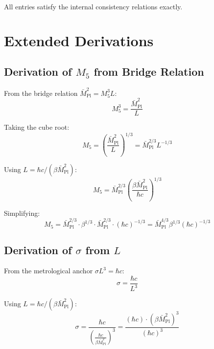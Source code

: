 \documentclass[11pt,a4paper]{article}
\begin{document}
All entries satisfy the internal consistency relations exactly.

\section{Extended Derivations}
\label{app:extended}

\subsection{Derivation of $M_5$ from Bridge Relation}

From the bridge relation $\bar{M}_{\text{Pl}}^2 = M_5^3 L$:
\begin{equation}
  M_5^3 = \frac{\bar{M}_{\text{Pl}}^2}{L}
  \label{eq:M5-cubed}
\end{equation}

Taking the cube root:
\begin{equation}
  M_5 = \left( \frac{\bar{M}_{\text{Pl}}^2}{L} \right)^{1/3}
      = \bar{M}_{\text{Pl}}^{2/3} L^{-1/3}
  \label{eq:M5-explicit}
\end{equation}

Using $L = \hbar c / (\beta \bar{M}_{\text{Pl}}^2)$:
\begin{equation}
  M_5 = \bar{M}_{\text{Pl}}^{2/3} \left( \frac{\beta \bar{M}_{\text{Pl}}^2}{\hbar c} \right)^{1/3}
  \label{eq:M5-from-beta}
\end{equation}

Simplifying:
\begin{equation}
  M_5 = \bar{M}_{\text{Pl}}^{2/3} \cdot \beta^{1/3} \cdot \bar{M}_{\text{Pl}}^{2/3} \cdot (\hbar c)^{-1/3}
      = \bar{M}_{\text{Pl}}^{4/3} \beta^{1/3} (\hbar c)^{-1/3}
  \label{eq:M5-simplified}
\end{equation}

\subsection{Derivation of $\sigma$ from $L$}

From the metrological anchor $\sigma L^3 = \hbar c$:
\begin{equation}
  \sigma = \frac{\hbar c}{L^3}
  \label{eq:sigma-explicit}
\end{equation}

Using $L = \hbar c / (\beta \bar{M}_{\text{Pl}}^2)$:
\begin{equation}
  \sigma = \frac{\hbar c}{\left( \frac{\hbar c}{\beta \bar{M}_{\text{Pl}}^2} \right)^3}
         = \frac{(\hbar c) \cdot (\beta \bar{M}_{\text{Pl}}^2)^3}{(\hbar c)^3}
  \label{eq:sigma-sub}
\end{equation}
\end{document}
